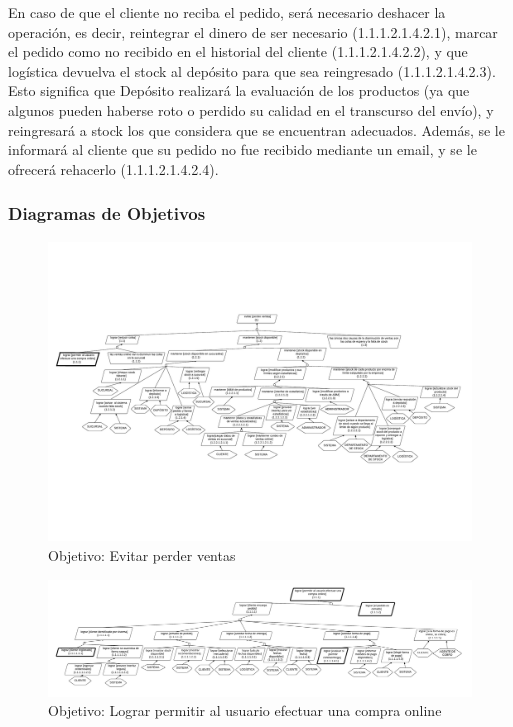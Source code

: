 En caso de que el cliente no reciba el pedido, será necesario deshacer la
operación, es decir, reintegrar el dinero de ser necesario (1.1.1.2.1.4.2.1),
marcar el pedido como no recibido en el historial del cliente (1.1.1.2.1.4.2.2),
y que logística devuelva el stock al depósito para que sea reingresado
(1.1.1.2.1.4.2.3). Esto significa que Depósito realizará la evaluación de los
productos (ya que algunos pueden haberse roto o perdido su calidad en el
transcurso del envío), y reingresará a stock los que considera que se encuentran
adecuados. Además, se le informará al cliente que su pedido no fue recibido
mediante un email, y se le ofrecerá rehacerlo (1.1.1.2.1.4.2.4).

\subsubsection{Diagramas de Objetivos}
\begin{figure}[H]
  \begin{center}
  \includegraphics[angle=90,height=\textheight]{images/objetivos-raiz.pdf}
  \caption{Objetivo: Evitar perder ventas}
  \end{center}
\end{figure}

\newpage
\begin{figure}[H]
  \begin{center}
  \includegraphics[angle=90,height=\textheight]{images/objetivos-operacion-online.pdf}
  \caption{Objetivo: Lograr permitir al usuario efectuar una compra online}
  \end{center}
\end{figure}

